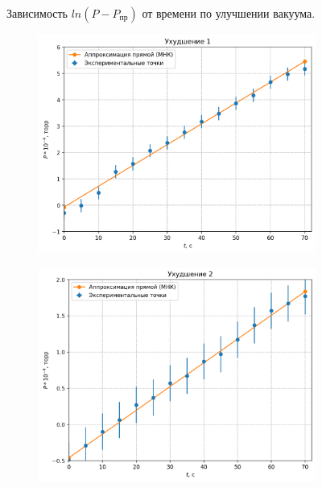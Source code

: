 \documentclass[a4paper,12pt]{article} %
\begin{document}
\begin{enumerate}
\begin{figure}[H]
\begin{subfigure}[b]{0.4\textwidth}
        \end{subfigure}
        \caption{Зависимость $ln(P-P_{\text{пр}})$ от времени по улучшении вакуума.}
      \end{figure}
      \begin{figure}[H]
        \centering
        \begin{subfigure}[b]{0.4\textwidth}
          \includegraphics[width=\textwidth]{graphup1.png}
        \end{subfigure}
        \hfill
        \begin{subfigure}[b]{0.4\textwidth}
          \includegraphics[width=\textwidth]{graphup2.png}
        \end{subfigure}

\end{figure}
\end{enumerate}
\end{document}
